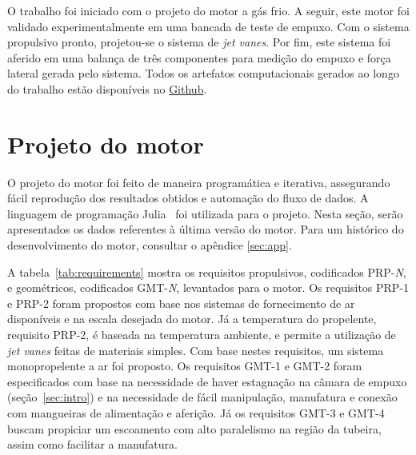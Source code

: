 
O trabalho foi iniciado com o projeto do motor a gás frio. A seguir, este motor foi validado experimentalmente em uma bancada de teste de empuxo. Com o sistema propulsivo pronto, projetou-se o sistema de \textit{jet vanes}. Por fim, este sistema foi aferido em uma balança de três componentes para medição do empuxo e força lateral gerada pelo sistema. Todos os artefatos computacionais gerados ao longo do trabalho estão disponíveis no \href{https://github.com/pekpuglia/IC-Thrust-Vector-Control}{Github}.

\section{Projeto do motor}\label{sec:motor_project}

O projeto do motor foi feito de maneira programática e iterativa, assegurando fácil reprodução dos resultados obtidos e automação do fluxo de dados. A linguagem de programação Julia~\cite{Julia-2017} foi utilizada para o projeto. Nesta seção, serão apresentados os dados referentes à última versão do motor. Para um histórico do desenvolvimento do motor, consultar o apêndice \ref{sec:app}\@.  

A tabela~\ref{tab:requirements} mostra os requisitos propulsivos, codificados PRP-\textit{N}, e geométricos, codificados GMT-\textit{N}, levantados para o motor. Os requisitos PRP-1 e PRP-2 foram propostos com base nos sistemas de fornecimento de ar disponíveis e na escala desejada do motor. Já a temperatura do propelente, requisito PRP-2, é baseada na temperatura ambiente, e permite a utilização de \textit{jet vanes} feitas de materiais simples. Com base nestes requisitos, um sistema monopropelente a ar foi proposto. Os requisitos GMT-1 e GMT-2 foram especificados com base na necessidade de haver estagnação na câmara de empuxo (seção~\ref{sec:intro}) e na necessidade de fácil manipulação, manufatura e conexão com mangueiras de alimentação e aferição. Já os requisitos GMT-3 e GMT-4 buscam propiciar um escoamento com alto paralelismo na região da tubeira, assim como facilitar a manufatura.

